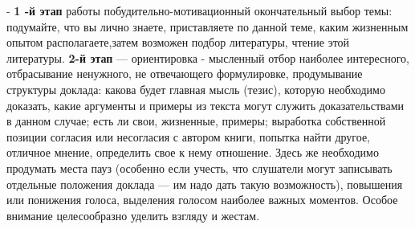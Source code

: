 -  \textbf{1 -й этап} работы побудительно-мотивационный окончательный выбор темы: подумайте, что вы лично знаете, приставляете по данной теме, каким жизненным опытом располагаете,затем возможен подбор литературы, чтение этой литературы.
 \textbf{2-й этап} — ориентировка - мысленный отбор наиболее интересного, отбрасывание ненужного, не отвечающего формулировке, продумывание структуры доклада: какова будет главная мысль (тезис), которую необходимо доказать, какие аргументы и примеры из текста могут служить доказательствами в данном случае; есть ли свои, жизненные, примеры; выработка собственной позиции согласия или несогласия с автором  книги, попытка найти другое, отличное мнение, определить свое к нему отношение. Здесь же необходимо продумать места пауз (особенно если учесть, что слушатели могут записывать отдельные положения доклада — им надо дать такую возможность), повышения или понижения голоса, выделения голосом наиболее важных моментов. Особое внимание целесообразно уделить взгляду и жестам. 
